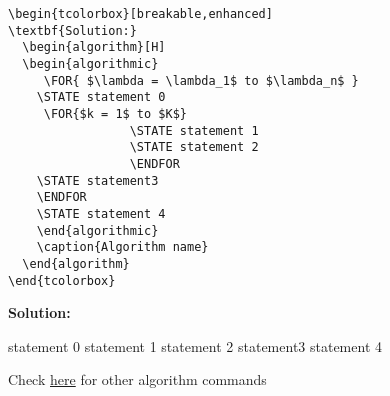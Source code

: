 \documentclass[twoside,12pt]{article}
\begin{document}
\begin{itemize}
\begin{lstlisting}
\begin{tcolorbox}[breakable,enhanced]
\textbf{Solution:}
  \begin{algorithm}[H]
  \begin{algorithmic}
     \FOR{ $\lambda = \lambda_1$ to $\lambda_n$ }
    \STATE statement 0
     \FOR{$k = 1$ to $K$}
                 \STATE statement 1
                 \STATE statement 2                
                 \ENDFOR
    \STATE statement3  
    \ENDFOR
    \STATE statement 4
    \end{algorithmic}
    \caption{Algorithm name}
  \end{algorithm}
\end{tcolorbox}
\end{lstlisting}

\begin{tcolorbox}
\textbf{Solution:}
  \begin{algorithm}[H]
  \begin{algorithmic}
    \STATE statement 0
                 \STATE statement 1
                 \STATE statement 2                
                 \ENDFOR
    \STATE statement3  
    \ENDFOR
    \STATE statement 4
    \end{algorithmic}
    \caption{Algorithm name}
  \end{algorithm}
 Check \href{https://ctan.math.illinois.edu/macros/latex/contrib/algorithms/algorithms.pdf}{\color{blue}here} for other algorithm commands 
\end{tcolorbox}
\end{itemize}
\end{document}

